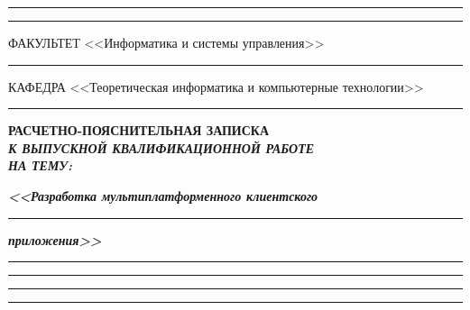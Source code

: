 \documentclass[14pt, russian]{scrartcl}
\begin{document}
\begin{titlepage}
\vspace{-2pt}
\hspace{-34.5pt}\rule{\textwidth}{0.5pt}

\vspace*{-18.3pt}
\hspace{-34.5pt}\rule{\textwidth}{2.5pt}
 
\vspace{0.5ex}
\noindent \small ФАКУЛЬТЕТ\hspace{80pt} <<Информатика и системы управления>>

\vspace*{-16pt}
\hspace{35pt}\rule{0.855\textwidth}{0.4pt}

\vspace{0.5ex}
\noindent \small КАФЕДРА\hspace{50pt} <<Теоретическая информатика и компьютерные технологии>>

\vspace*{-16pt}
\hspace{25pt}\rule{0.875\textwidth}{0.4pt}
 
 
\vspace{3em}
 
\begin{center}
\Large \bf{РАСЧЕТНО-ПОЯСНИТЕЛЬНАЯ ЗАПИСКА\\\textbf{\textit{К ВЫПУСКНОЙ КВАЛИФИКАЦИОННОЙ РАБОТЕ\\НА ТЕМУ:}} \\}
\end{center}

\vspace*{-6ex} 
\begin{center}
\Large{\textit{\textbf{<<Разработка мультиплатформенного клиентского }}}

\vspace*{-3ex}
\rule{1\textwidth}{1.2pt}

\vspace*{-1ex} 
\Large{\textit{\textbf{приложения>>}}}

\vspace*{-3ex}
\rule{1\textwidth}{1.2pt}

\vspace*{-0.2ex}
\rule{1\textwidth}{1.2pt}

\vspace*{-0.2ex}
\rule{1\textwidth}{1.2pt}

\vspace*{-0.2ex}
\rule{1\textwidth}{1.2pt}
\end{center}
 

\end{titlepage}
\end{document}
